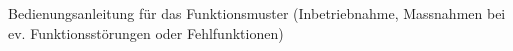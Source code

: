 \documentclass[../../main.tex]{subfiles}
\begin{document}
Bedienungsanleitung für das Funktionsmuster (Inbetriebnahme, Massnahmen bei ev. Funktionsstörungen oder Fehlfunktionen) 
\end{document}
